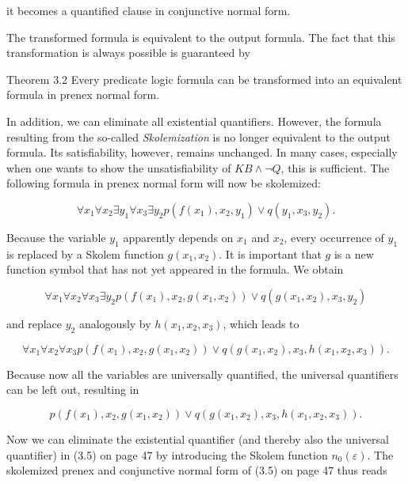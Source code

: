 \documentclass[10pt]{book}
\begin{document}
it becomes a quantified clause in conjunctive normal form.

The transformed formula is equivalent to the output formula. The fact that this transformation is always possible is guaranteed by

\begin{displayquote}
Theorem 3.2 Every predicate logic formula can be transformed into an equivalent formula in prenex normal form.
\end{displayquote}

In addition, we can eliminate all existential quantifiers. However, the formula resulting from the so-called \textit{Skolemization} is no longer equivalent to the output formula. Its satisfiability, however, remains unchanged. In many cases, especially when one wants to show the unsatisfiability of $K B \wedge \neg Q$, this is sufficient. The following formula in prenex normal form will now be skolemized:

$$
\forall x_{1} \forall x_{2} \exists y_{1} \forall x_{3} \exists y_{2} p\left(f\left(x_{1}\right), x_{2}, y_{1}\right) \vee q\left(y_{1}, x_{3}, y_{2}\right) .
$$

Because the variable $y_{1}$ apparently depends on $x_{1}$ and $x_{2}$, every occurrence of $y_{1}$ is replaced by a Skolem function $g\left(x_{1}, x_{2}\right)$. It is important that $g$ is a new function symbol that has not yet appeared in the formula. We obtain

$$
\forall x_{1} \forall x_{2} \forall x_{3} \exists y_{2} p\left(f\left(x_{1}\right), x_{2}, g\left(x_{1}, x_{2}\right)\right) \vee q\left(g\left(x_{1}, x_{2}\right), x_{3}, y_{2}\right)
$$

and replace $y_{2}$ analogously by $h\left(x_{1}, x_{2}, x_{3}\right)$, which leads to

$$
\forall x_{1} \forall x_{2} \forall x_{3} p\left(f\left(x_{1}\right), x_{2}, g\left(x_{1}, x_{2}\right)\right) \vee q\left(g\left(x_{1}, x_{2}\right), x_{3}, h\left(x_{1}, x_{2}, x_{3}\right)\right) .
$$

Because now all the variables are universally quantified, the universal quantifiers can be left out, resulting in

$$
p\left(f\left(x_{1}\right), x_{2}, g\left(x_{1}, x_{2}\right)\right) \vee q\left(g\left(x_{1}, x_{2}\right), x_{3}, h\left(x_{1}, x_{2}, x_{3}\right)\right) .
$$

Now we can eliminate the existential quantifier (and thereby also the universal quantifier) in (3.5) on page 47 by introducing the Skolem function $n_{0}(\varepsilon)$. The skolemized prenex and conjunctive normal form of (3.5) on page 47 thus reads
\end{document}
